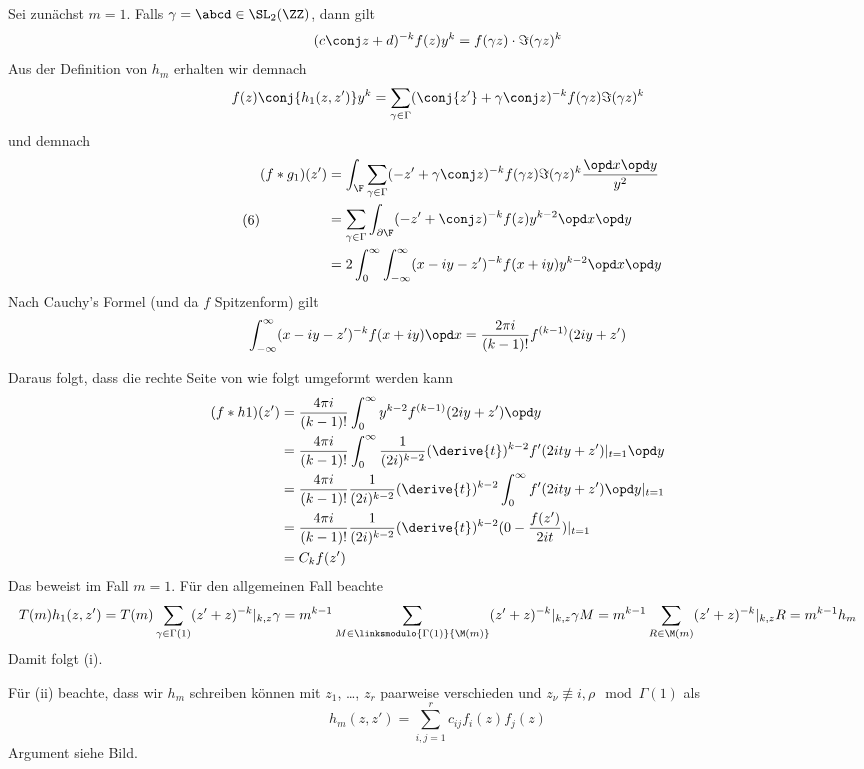 \begin{bewe}
	Sei zunächst $m=1$.
	Falls $\gamma = \abcd \in \SL_2(\ZZ)$, dann gilt
	\[
		(c\conj z + d)^{-k} f(z) y^k = f(\gamma z) \cdot \Im (\gamma z)^k
	\]
	Aus der Definition von $h_m$ erhalten wir demnach
	\[
		f(z)\conj{h_1(z, z')} y^k
		= \sum_{\gamma \in \Gamma} (\conj{z'} + \gamma \conj z)^{-k} f(\gamma z) \Im(\gamma z)^k
	\]
	und demnach
	\begin{equation}\tag{6}
	\begin{split}
		(f * g_1)(z') &= \int_\F \sum_{\gamma \in \Gamma} (-z' + \gamma \conj z)^{-k} f(\gamma z) \Im(\gamma z)^k \frac{\opd x \opd y}{y^2} \\
		&= \sum_{\gamma \in \Gamma} \int_{\partial \F} (-z' + \conj z)^{-k} f(z) y^{k-2} \opd x \opd y \\
		&= 2 \int_0^\infty \int_{-\infty}^\infty (x-iy - z')^{-k} f(x+iy) y^{k-2} \opd x \opd y
		\end{split}
	\end{equation}
	Nach Cauchy's Formel (und da $f$ Spitzenform) gilt
	\[
		\int_{-\infty}^\infty (x-iy - z')^{-k} f(x+iy) \opd x
		= \frac{2\pi i}{(k-1)!} f^{(k-1)} (2iy + z')
	\]
	
	Daraus folgt, dass die rechte Seite von  wie folgt umgeformt werden kann
	\begin{equation*}
	\begin{split}
		(f * h1)(z') &= \frac{4\pi i}{(k-1)!} \int_0^\infty y^{k-2} f^{(k-1)} (2iy + z') \opd y \\
		&= \frac{4\pi i}{(k-1)!} \int_0^\infty \frac{1}{(2i)^{k-2}} (\derive{t})^{k-2} f'(2ity + z') |_{t=1} \opd y \\
		&= \frac{4\pi i}{(k-1)!} \frac{1}{(2i)^{k-2}} (\derive{t})^{k-2} \int_0^\infty f'(2i ty + z') \opd y |_{t=1} \\
		&= \frac{4\pi i}{(k-1)!} \frac{1}{(2i)^{k-2}} (\derive{t})^{k-2} ( 0 - \frac{f(z')}{2it}) |_{t=1} \\
		&= C_k f(z')
	\end{split}
	\end{equation*}
	Das beweist  im Fall $m=1$.
	Für den allgemeinen Fall beachte
	\[
		T(m)h_1(z,z') = T(m) \sum_{\gamma\in\Gamma(1)} (z'+z)^{-k} |_{k,z} \gamma
		= m^{k-1} \sum_{M \in \linksmodulo{\Gamma(1)}{\M(m)}} (z'+z)^{-k} |_{k,z} \gamma M
		= m^{k-1} \sum_{R \in \M(m)} (z'+z)^{-k}|_{k,z} R
		= m^{k-1} h_m
	\]
	Damit folgt (i).
	
	Für (ii) beachte, dass wir $h_m$ schreiben können mit $z_1$, \ldots, $z_r$ paarweise verschieden und $z_\nu \not\equiv i, \rho \mod \Gamma(1)$ als
	\[
		h_m(z,z') = \sum_{i,j=1}^r c_{ij}f_i(z)f_j(z)
	\]
	Argument siehe Bild.
	

\end{bewe}
